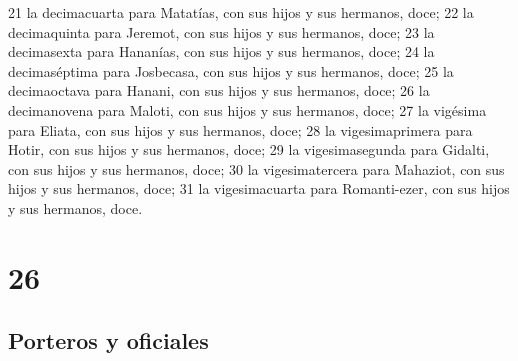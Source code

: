 21 la decimacuarta para Matatías, con sus hijos y sus hermanos, doce;
22 la decimaquinta para Jeremot, con sus hijos y sus hermanos, doce;
23 la decimasexta para Hananías, con sus hijos y sus hermanos, doce;
24 la decimaséptima para Josbecasa, con sus hijos y sus hermanos, doce;
25 la decimaoctava para Hanani, con sus hijos y sus hermanos, doce;
26 la decimanovena para Maloti, con sus hijos y sus hermanos, doce;
27 la vigésima para Eliata, con sus hijos y sus hermanos, doce;
28 la vigesimaprimera para Hotir, con sus hijos y sus hermanos, doce;
29 la vigesimasegunda para Gidalti, con sus hijos y sus hermanos, doce;
30 la vigesimatercera para Mahaziot, con sus hijos y sus hermanos, doce;
31 la vigesimacuarta para Romanti-ezer, con sus hijos y sus hermanos, doce.

\chapter{26}

\section*{Porteros y oficiales}

